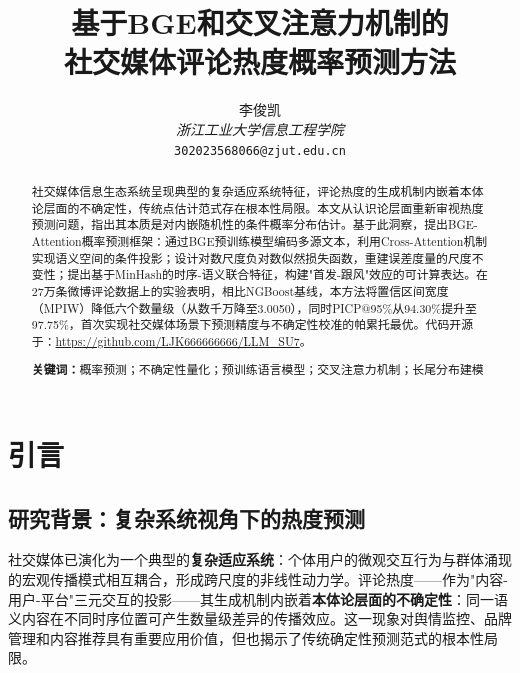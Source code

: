 \documentclass[10pt]{article}
\begin{document}
\title{\textbf{基于BGE和交叉注意力机制的\\
社交媒体评论热度概率预测方法}}

\author{
    李俊凯\\
    \textit{浙江工业大学信息工程学院}\\
    \texttt{302023568066@zjut.edu.cn}
}

\date{}

\maketitle

\begin{abstract}
社交媒体信息生态系统呈现典型的复杂适应系统特征，评论热度的生成机制内嵌着本体论层面的不确定性，传统点估计范式存在根本性局限。本文从认识论层面重新审视热度预测问题，指出其本质是对内嵌随机性的条件概率分布估计。基于此洞察，提出BGE-Attention概率预测框架：通过BGE预训练模型编码多源文本，利用Cross-Attention机制实现语义空间的条件投影；设计对数尺度负对数似然损失函数，重建误差度量的尺度不变性；提出基于MinHash的时序-语义联合特征，构建"首发-跟风"效应的可计算表达。在27万条微博评论数据上的实验表明，相比NGBoost基线，本方法将置信区间宽度（MPIW）降低六个数量级（从数千万降至3.0050），同时PICP@95\%从94.30\%提升至97.75\%，首次实现社交媒体场景下预测精度与不确定性校准的帕累托最优。代码开源于：\url{https://github.com/LJK666666666/LLM_SU7}。

\textbf{关键词：}概率预测；不确定性量化；预训练语言模型；交叉注意力机制；长尾分布建模
\end{abstract}

\section{引言}

\subsection{研究背景：复杂系统视角下的热度预测}

社交媒体已演化为一个典型的\textbf{复杂适应系统}：个体用户的微观交互行为与群体涌现的宏观传播模式相互耦合，形成跨尺度的非线性动力学\cite{liu2019sentiment}。评论热度——作为"内容-用户-平台"三元交互的投影——其生成机制内嵌着\textbf{本体论层面的不确定性}：同一语义内容在不同时序位置可产生数量级差异的传播效应。这一现象对舆情监控\cite{zhang2020brand}、品牌管理和内容推荐\cite{wu2019npa}具有重要应用价值，但也揭示了传统确定性预测范式的根本性局限。
\end{document}
